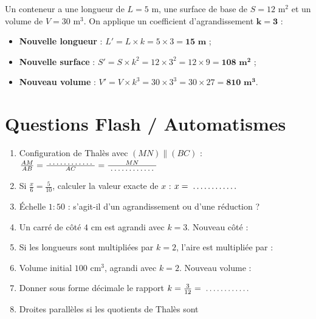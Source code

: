 \begin{cadreexemple}
Un conteneur a une longueur de $L = 5\text{ m}$, une surface de base de $S = 12\text{ m}^2$ et un volume de $V = 30\text{ m}^3$.
On applique un coefficient d'agrandissement $\mathbf{k = 3}$ :
\begin{itemize}[leftmargin=1.5em, itemsep=1pt]
    \item \textbf{Nouvelle longueur} : $L' = L \times k = 5 \times 3 = \mathbf{15\text{ m}}$ ;
    \item \textbf{Nouvelle surface} : $S' = S \times k^2 = 12 \times 3^2 = 12 \times 9 = \mathbf{108\text{ m}^2}$ ;
    \item \textbf{Nouveau volume} : $V' = V \times k^3 = 30 \times 3^3 = 30 \times 27 = \mathbf{810\text{ m}^3}$.
\end{itemize}
\end{cadreexemple}

\newpage

\section{Questions Flash / Automatismes}

\begin{automatisme}
\begin{enumerate}[label=\textbf{Q\arabic*.}, itemsep=1pt]
    \item Configuration de Thalès avec $(MN) \parallel (BC)$ : $\frac{AM}{AB} = \frac{\pointille[2cm]}{AC} = \frac{MN}{\pointille[2cm]}$
    \item Si $\frac{x}{6} = \frac{5}{10}$, calculer la valeur exacte de $x$ : $x = \pointille[2cm]$
    \item Échelle $1:50$ : s'agit-il d'un agrandissement ou d'une réduction ? \pointille[3cm]
    \item Un carré de côté $4\text{ cm}$ est agrandi avec $k = 3$. Nouveau côté : \pointille[2cm]
    \item Si les longueurs sont multipliées par $k = 2$, l'aire est multipliée par : \pointille[2cm]
    \item Volume initial $100\text{ cm}^3$, agrandi avec $k=2$. Nouveau volume : \pointille[2cm]
    \item Donner sous forme décimale le rapport $k = \frac{3}{12} = \pointille[2cm] $
    \item Droites parallèles si les quotients de Thalès sont \pointille[3cm]
\end{enumerate}
\end{automatisme}

